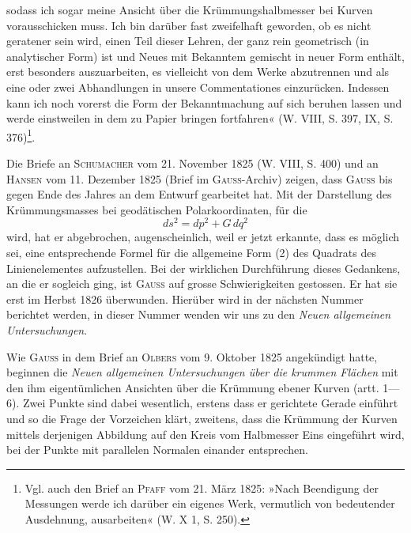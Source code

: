 sodass ich sogar meine Ansicht über die Krümmungshalbmesser
bei  Kurven vorausschicken muss. Ich bin darüber fast zweifelhaft
geworden, ob es nicht geratener sein wird, einen Teil dieser Lehren, der ganz
rein geometrisch (in analytischer Form) ist und Neues mit Bekanntem gemischt
in neuer Form enthält, erst besonders auszuarbeiten, es vielleicht von dem
Werke abzutrennen und als eine oder zwei Abhandlungen in unsere Commentationes
einzurücken. Indessen kann ich noch vorerst die Form der Bekanntmachung
auf sich beruhen lassen und werde einstweilen in dem zu Papier
bringen fortfahren« (W. VIII, S. 397, IX, S. 376)\footnote{Vgl. auch den Brief an \textsc{Pfaff} vom 21. März 1825: »Nach Beendigung der Messungen werde ich darüber ein eigenes Werk, vermutlich von bedeutender Ausdehnung, ausarbeiten« (W. X 1, S. 250).}.
\par
Die Briefe an \textsc{Schumacher} vom 21. November 1825 (W. VIII, S. 400) und
an \textsc{Hansen} vom 11. Dezember 1825 (Brief im \textsc{Gauss}-Archiv) zeigen, dass \textsc{Gauss}
bis gegen Ende des Jahres an dem Entwurf gearbeitet hat. Mit der Darstellung
des Krümmungsmasses bei geodätischen Polarkoordinaten, für die
\begin{equation}ds^2=dp^2+G\,dq^2\tag{3}\end{equation}
\clearpage{}\setcounter{footnote}{0}
\noindent wird, hat er abgebrochen, augenscheinlich, weil er jetzt erkannte, dass es
möglich sei, eine entsprechende Formel für die allgemeine Form (2) des Quadrats
des Linienelementes aufzustellen. Bei der wirklichen Durchführung
dieses Gedankens, an die er sogleich ging, ist \textsc{Gauss} auf grosse Schwierigkeiten
gestossen. Er hat sie erst im Herbst 1826 überwunden. Hierüber
wird in der nächsten Nummer berichtet werden, in dieser Nummer wenden
wir uns zu den \textit{Neuen allgemeinen Untersuchungen}.
\par
Wie \textsc{Gauss} in dem Brief an \textsc{Olbers} vom 9. Oktober 1825 angekündigt
hatte, beginnen die \textit{Neuen allgemeinen Untersuchungen über die krummen Flächen}
mit den ihm eigentümlichen Ansichten über die Krümmung ebener Kurven
(artt. 1—6). Zwei Punkte sind dabei wesentlich, erstens dass er gerichtete
Gerade einführt und so die Frage der Vorzeichen klärt, zweitens, dass die
Krümmung der Kurven mittels derjenigen Abbildung auf den Kreis vom
Halbmesser Eins eingeführt wird, bei der Punkte mit parallelen Normalen
einander entsprechen.
\par
